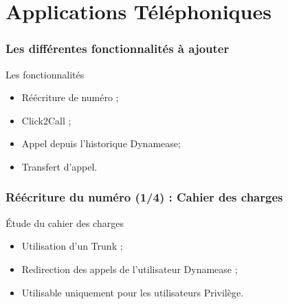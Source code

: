 \section{Applications Téléphoniques}
\author{Kévin Moreau}


\begin{frame}
	\frametitle{Les différentes fonctionnalités à ajouter}

	\begin{block}{Les fonctionnalités}
	 \begin{itemize}
      \item Réécriture de numéro ;
	  \item Click2Call ;
	  \item Appel depuis l'historique Dynamease;
	  \item Transfert d'appel.
	 \end{itemize}
	\end{block}
\end{frame}

\begin{frame}
	\frametitle{Réécriture du numéro (1/4) : Cahier des charges}

	\begin{block}{Étude du cahier des charges}
	 \begin{itemize}
      \item Utilisation d'un Trunk ;
      \item Redirection des appels de l'utilisateur Dynamease ;
      \item Utilisable uniquement pour les utilisateurs Privilège.
	 \end{itemize}
	\end{block}
\end{frame}

